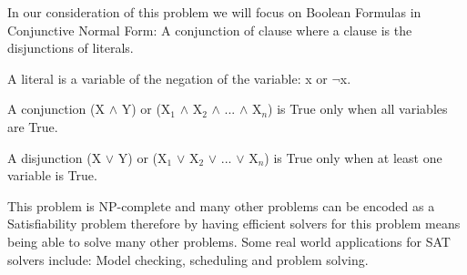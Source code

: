 \documentclass[12pt,a4paper]{article}
\begin{document}
In our consideration of this problem we will focus on Boolean Formulas in Conjunctive Normal Form: A conjunction of clause where a clause is the disjunctions of literals. 
\begin{itemize}
	\begin{item}
	A literal is a variable of the negation of the variable: x or $\neg$x.
	\end{item}
	\begin{item}
	A conjunction (X $\land$ Y) or (X$_1$ $\land$ X$_2$ $\land$ ... $ \land$ X$_n$) is True only when all variables are True.
	\end{item}
	\begin{item}
	A disjunction (X $\lor$ Y) or (X$_1$ $\lor$ X$_2$ $\lor$ ... $\lor$ X$_n$) is True only when at least one variable is True.
	\end{item}
\end{itemize}
This problem is NP-complete and many other problems can be encoded as a Satisfiability problem therefore by having efficient solvers for this problem means being able to solve many other problems. Some real world applications for SAT solvers include: Model checking, scheduling and problem solving.\\\\
\end{document}
